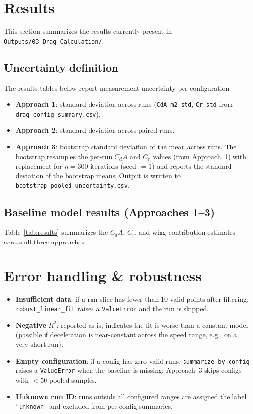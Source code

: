 \documentclass[11pt,a4paper]{article}
\begin{document}
\section{Results}
This section summarizes the results currently present in
\texttt{Outputs/03\_Drag\_Calculation/}.

\subsection{Uncertainty definition}
The results tables below report measurement uncertainty per configuration:
\begin{itemize}
  \item \textbf{Approach 1}: standard deviation across runs
        (\texttt{CdA\_m2\_std}, \texttt{Cr\_std} from
        \texttt{drag\_config\_summary.csv}).
  \item \textbf{Approach 2}: standard deviation across paired runs.
  \item \textbf{Approach 3}: bootstrap standard deviation of the mean across
        runs.  The bootstrap resamples the per-run $C_dA$ and $C_r$ values
        (from Approach~1) with replacement for $n=300$ iterations (seed~$=1$)
        and reports the standard deviation of the bootstrap means.  Output is
        written to \texttt{bootstrap\_pooled\_uncertainty.csv}.
\end{itemize}

\subsection{Baseline model results (Approaches 1--3)}
Table~\ref{tab:results} summarizes the $C_dA$, $C_r$, and wing-contribution
estimates across all three approaches.



\section{Error handling \& robustness}
\begin{itemize}
  \item \textbf{Insufficient data}: if a run slice has fewer than 10 valid
        points after filtering, \texttt{robust\_linear\_fit} raises a
        \texttt{ValueError} and the run is skipped.
  \item \textbf{Negative $R^2$}: reported as-is; indicates the fit is worse than
        a constant model (possible if deceleration is near-constant across the
        speed range, e.g., on a very short run).
  \item \textbf{Empty configuration}: if a config has zero valid runs,
        \texttt{summarize\_by\_config} raises a \texttt{ValueError} when the
        baseline is missing; Approach~3 skips configs with $<50$ pooled samples.
  \item \textbf{Unknown run ID}: runs outside all configured ranges are
        assigned the label \texttt{"unknown"} and excluded from per-config
        summaries.
\end{itemize}
\end{document}
